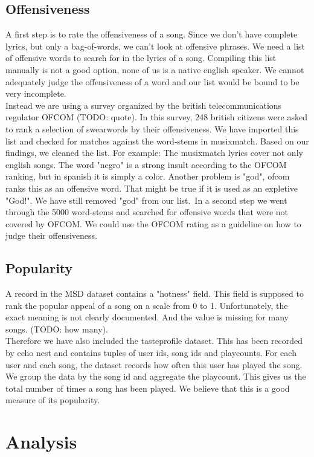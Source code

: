 \documentclass[11pt]{article}
\begin{document}
\subsection{Offensiveness}
A first step is to rate the offensiveness of a song. Since we don't have complete lyrics, but only a bag-of-words, we can't look at offensive phrases.
We need a list of offensive words to search for in the lyrics of a song. Compiling this list manually is not a good option, none of us is a native english speaker. We cannot adequately judge the 
offensiveness of a word and our list would be bound to be very incomplete.\\
Instead we are using a survey organized by the british telecommunications regulator OFCOM (TODO: quote). In this survey, 248 british citizens were asked to rank a selection of swearwords by their offensiveness.
We have imported this list and checked for matches against the word-stems in musixmatch. Based on our findings, we cleaned the list. For example: The musixmatch lyrics cover not only english songs.
The word "negro" is a strong insult according to the OFCOM ranking, but in spanish it is simply a color.
Another problem is "god", ofcom ranks this as an offensive word. That might be true if it is used as an expletive "God!". We have still removed "god" from our list.\
In a second step we went through the 5000 word-stems and searched for offensive words that were not covered by OFCOM.
We could use the OFCOM rating as a guideline on how to judge their offensiveness.

\subsection{Popularity}
A record in the MSD dataset contains a "hotness" field. This field is supposed to rank the popular appeal of a song on a scale from 0 to 1.
Unfortunately, the exact meaning is not clearly documented. And the value is missing for many songs. (TODO: how many).\\

Therefore we have also included the tasteprofile dataset. This has been recorded by echo nest and contains tuples of user ids, song ids and playcounts.
For each user and each song, the dataset records how often this user has played the song. We group the data by the song id and aggregate the playcount.
This gives us the total number of times a song has been played. We believe that this is a good measure of its popularity.
\section{Analysis}
\end{document}
